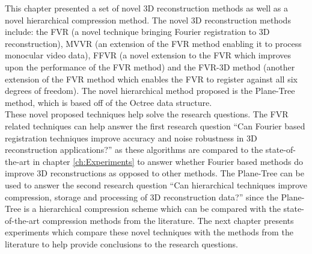 
This chapter presented a set of novel 3D reconstruction methods as well as a novel hierarchical compression method. The novel 3D reconstruction methods include: the FVR (a novel technique bringing Fourier registration to 3D reconstruction), MVVR (an extension of the FVR method enabling it to process monocular video data), FFVR (a novel extension to the FVR which improves upon the performance of the FVR method) and the FVR-3D method (another extension of the FVR method which enables the FVR to register against all six degrees of freedom). The novel hierarchical method proposed is the Plane-Tree method, which is based off of the Octree data structure. \\

These novel proposed techniques help solve the research questions. The FVR related techniques can help answer the first research question ``Can Fourier based registration techniques improve accuracy and noise robustness in 3D reconstruction applications?'' as these algorithms are compared to the state-of-the-art in chapter \ref{ch:Experiments} to answer whether Fourier based methods do improve 3D reconstructions as opposed to other methods. The Plane-Tree can be used to answer the second research question ``Can hierarchical techniques improve compression, storage and processing of 3D reconstruction data?'' since the Plane-Tree is a hierarchical compression scheme which can be compared with the state-of-the-art compression methods from the literature. The next chapter presents experiments which compare these novel techniques with the methods from the literature to help provide conclusions to the research questions. \\
